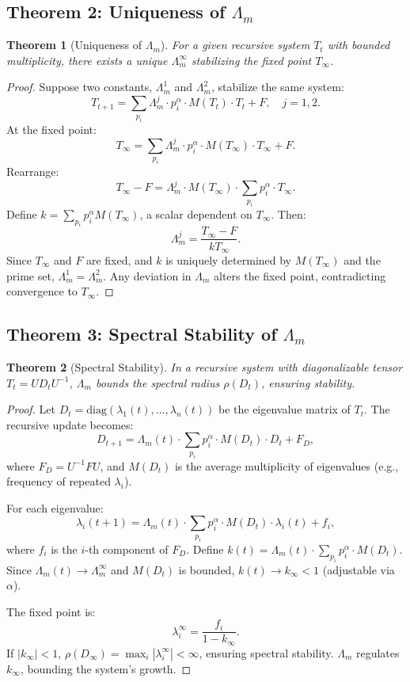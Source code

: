 \documentclass{article}
\theoremstyle{plain}
\newtheorem{theorem}{Theorem}
\begin{document}
\subsection{Theorem 2: Uniqueness of \(\Lambda_m\)}
\begin{theorem}[Uniqueness of \(\Lambda_m\)]
For a given recursive system \( T_t \) with bounded multiplicity, there exists a unique \(\Lambda_m^\infty\) stabilizing the fixed point \( T_\infty \).
\end{theorem}

\begin{proof}
Suppose two constants, \(\Lambda_m^1\) and \(\Lambda_m^2\), stabilize the same system:
\[
T_{t+1} = \sum_{p_i} \Lambda_m^j \cdot p_i^\alpha \cdot M(T_t) \cdot T_t + F, \quad j = 1, 2.
\]
At the fixed point:
\[
T_\infty = \sum_{p_i} \Lambda_m^j \cdot p_i^\alpha \cdot M(T_\infty) \cdot T_\infty + F.
\]
Rearrange:
\[
T_\infty - F = \Lambda_m^j \cdot M(T_\infty) \cdot \sum_{p_i} p_i^\alpha \cdot T_\infty.
\]
Define \( k = \sum_{p_i} p_i^\alpha M(T_\infty) \), a scalar dependent on \( T_\infty \). Then:
\[
\Lambda_m^j = \frac{T_\infty - F}{k T_\infty}.
\]
Since \( T_\infty \) and \( F \) are fixed, and \( k \) is uniquely determined by \( M(T_\infty) \) and the prime set, \(\Lambda_m^1 = \Lambda_m^2\). Any deviation in \(\Lambda_m\) alters the fixed point, contradicting convergence to \( T_\infty \).
\end{proof}

\subsection{Theorem 3: Spectral Stability of \(\Lambda_m\)}
\begin{theorem}[Spectral Stability]
In a recursive system with diagonalizable tensor \( T_t = U D_t U^{-1} \), \(\Lambda_m\) bounds the spectral radius \(\rho(D_t)\), ensuring stability.
\end{theorem}

\begin{proof}
Let \( D_t = \text{diag}(\lambda_1(t), \ldots, \lambda_n(t)) \) be the eigenvalue matrix of \( T_t \). The recursive update becomes:
\[
D_{t+1} = \Lambda_m(t) \cdot \sum_{p_i} p_i^\alpha \cdot M(D_t) \cdot D_t + F_D,
\]
where \( F_D = U^{-1} F U \), and \( M(D_t) \) is the average multiplicity of eigenvalues (e.g., frequency of repeated \(\lambda_i\)).

For each eigenvalue:
\[
\lambda_i(t+1) = \Lambda_m(t) \cdot \sum_{p_i} p_i^\alpha \cdot M(D_t) \cdot \lambda_i(t) + f_i,
\]
where \( f_i \) is the \( i \)-th component of \( F_D \). Define \( k(t) = \Lambda_m(t) \cdot \sum_{p_i} p_i^\alpha \cdot M(D_t) \). Since \( \Lambda_m(t) \to \Lambda_m^\infty \) and \( M(D_t) \) is bounded, \( k(t) \to k_\infty < 1 \) (adjustable via \(\alpha\)).

The fixed point is:
\[
\lambda_i^\infty = \frac{f_i}{1 - k_\infty}.
\]
If \( |k_\infty| < 1 \), \(\rho(D_\infty) = \max_i |\lambda_i^\infty| < \infty\), ensuring spectral stability. \(\Lambda_m\) regulates \( k_\infty \), bounding the system’s growth.
\end{proof}
\end{document}
